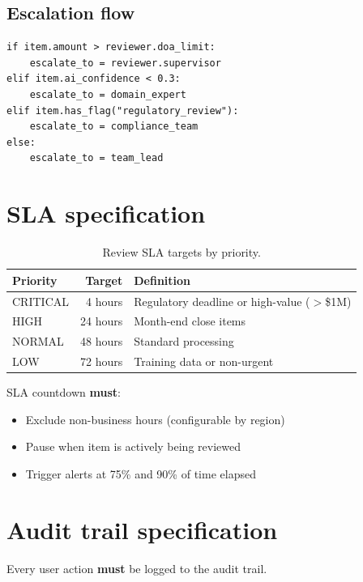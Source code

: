 \subsection{Escalation flow}

\begin{lstlisting}[basicstyle=\ttfamily\small,caption={Escalation routing rules.}]
if item.amount > reviewer.doa_limit:
    escalate_to = reviewer.supervisor
elif item.ai_confidence < 0.3:
    escalate_to = domain_expert
elif item.has_flag("regulatory_review"):
    escalate_to = compliance_team
else:
    escalate_to = team_lead
\end{lstlisting}

\section{SLA specification}

\begin{table}[htbp]
\centering
\caption{Review SLA targets by priority.}
\label{tab:review-sla}
\footnotesize
\begin{tabularx}{\linewidth}{@{}l r X@{}}
\toprule
\textbf{Priority} & \textbf{Target} & \textbf{Definition} \\ \midrule
CRITICAL & 4 hours & Regulatory deadline or high-value ($>$\$1M) \\
HIGH     & 24 hours & Month-end close items \\
NORMAL   & 48 hours & Standard processing \\
LOW      & 72 hours & Training data or non-urgent \\
\bottomrule
\end{tabularx}
\end{table}

SLA countdown \textbf{must}:
\begin{itemize}
  \item Exclude non-business hours (configurable by region)
  \item Pause when item is actively being reviewed
  \item Trigger alerts at 75\% and 90\% of time elapsed
\end{itemize}

\section{Audit trail specification}\label{sec:dashboard-audit-trail}

Every user action \textbf{must} be logged to the audit trail.

